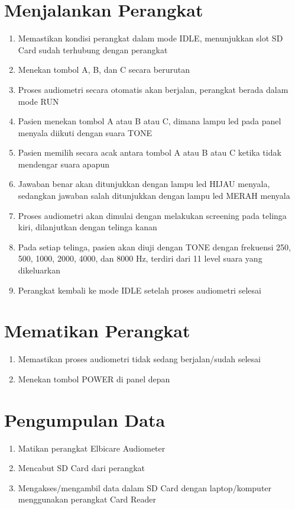 \documentclass[11pt,a4paper,twoside,onecolumn]{book}
\begin{document}
		\section{Menjalankan Perangkat}
		\begin{enumerate}
			\item Memastikan kondisi perangkat dalam mode IDLE, menunjukkan slot SD Card sudah terhubung dengan perangkat
			\item Menekan tombol A, B, dan C secara berurutan 
			\item Proses audiometri secara otomatis akan berjalan, perangkat berada dalam mode RUN 
			\item Pasien menekan tombol A atau B atau C, dimana lampu led pada panel menyala diikuti dengan suara TONE
			\item Pasien memilih secara acak antara tombol A atau B atau C ketika tidak mendengar suara apapun
			\item Jawaban benar akan ditunjukkan dengan lampu led HIJAU menyala, sedangkan jawaban salah ditunjukkan dengan lampu led MERAH menyala
			\item Proses audiometri akan dimulai dengan melakukan screening pada telinga kiri, dilanjutkan dengan telinga kanan
			\item Pada setiap telinga, pasien akan diuji dengan TONE dengan frekuensi 250, 500, 1000, 2000, 4000, dan 8000 Hz, terdiri dari 11 level suara yang dikeluarkan
			\item Perangkat kembali ke mode IDLE setelah proses audiometri selesai
		\end{enumerate}
		
		\section{Mematikan Perangkat}
		\begin{enumerate}
			\item Memastikan proses audiometri tidak sedang berjalan/sudah selesai
			\item Menekan tombol POWER di panel depan
		\end{enumerate}
	
		\section{Pengumpulan Data}
		\begin{enumerate}
			\item Matikan perangkat Elbicare Audiometer
			\item Mencabut SD Card dari perangkat 
			\item Mengakses/mengambil data dalam SD Card dengan laptop/komputer menggunakan perangkat Card Reader 
		\end{enumerate}
	
\end{document}
